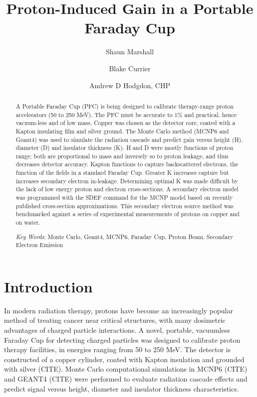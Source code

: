 \documentclass{mc2015}
\begin{document}
\title{Proton-Induced Gain in a Portable Faraday Cup}

\author{Shaun Marshall}
\author{Blake Currier}

\author{Andrew D Hodgdon, CHP}

\maketitle

\begin{abstract}
A Portable Faraday Cup (PFC) is being designed to calibrate therapy-range proton accelerators (50 to 250 MeV).  The PFC must be accurate to 1\% and practical, hence vacuum-less and of low mass.  Copper was chosen as the detector core, coated with a Kapton insulating film and silver ground.  The Monte Carlo method (MCNP6 and Geant4) was used to simulate the radiation cascade and predict gain versus height (H), diameter (D) and insulator thickness (K). H and D were mostly functions of proton range; both are proportional to mass and inversely so to proton leakage, and thus decreases detector accuracy. Kapton functions to capture backscattered electrons, the function of the fields in a standard Faraday Cup. Greater K increases capture but increases secondary electron in-leakage. Determining optimal K was made difficult by the lack of low energy proton and electron cross-sections. A secondary electron model was programmed with the SDEF command for the MCNP model based on recently published cross-section approximations. This secondary electron source method was benchmarked against a series of experimental measurements of protons on copper and on water.

\emph{Key Words}: Monte Carlo, Geant4, MCNP6, Faraday Cup, Proton Beam, Secondary Electron Emission
\end{abstract}


\section{Introduction}

In modern radiation therapy, protons have become an increasingly popular method of treating cancer near critical structures, with many dosimetric advantages of charged particle interactions\cite{ne05,ryckman}. A novel, portable, vacuumless Faraday Cup for detecting charged particles was designed to calibrate proton therapy facilities, in energies ranging from 50 to 250 MeV. The detector is constructed of a copper cylinder, coated with Kapton insulation and grounded with silver (CITE). Monte Carlo computational simulations in MCNP6 (CITE) and GEANT4 (CITE) were performed to evaluate radiation cascade effects and predict signal versus height, diameter and insulator thickness characteristics.
\end{document}
